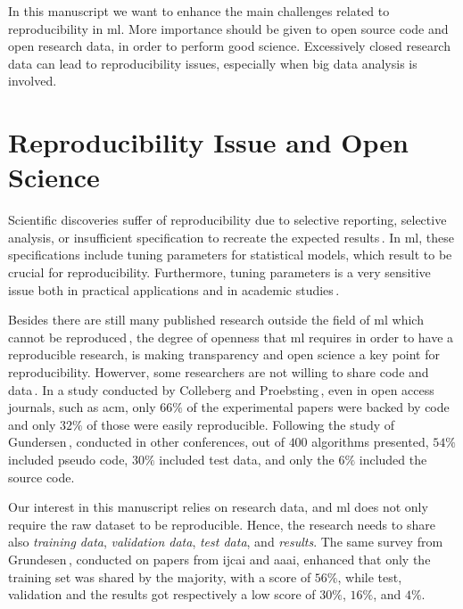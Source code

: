In this manuscript we want to enhance the main challenges related to reproducibility
in \ac{ml}. More importance should be given to open source
code and open research data, in order to perform good science.
Excessively closed research data can lead to reproducibility issues,
especially when big data analysis is involved.

\section{Reproducibility Issue and Open Science}
Scientific discoveries suffer of reproducibility due
to selective reporting, selective analysis, or insufficient specification to recreate the
expected results\,\cite{aarts2016reproducibility}. 
In \ac{ml}, these specifications include tuning parameters for statistical models, 
which result to be crucial for reproducibility. Furthermore, tuning parameters
is a very sensitive issue both in practical applications and in academic studies\,\cite{birattari2004problem}.

Besides there are still many published research outside the field of \ac{ml} which cannot be
reproduced\,\cite{begley2012drug, begley2015reproducibility, prinz2011believe},
the degree of openness that \ac{ml} requires in order to have a reproducible research, is making
transparency and open science a key point for reproducibility.
Howerver, some researchers are not willing to share code and data\,\cite{gundersen2018state}.
In a study conducted by Colleberg and Proebsting\,\cite{Collberg:2016:RCS:2897191.2812803},
even in open access journals, such as \ac{acm}, only $66\%$ of the experimental papers
were backed by code and only $32\%$ of those were easily reproducible.
Following the study of Gundersen\,\cite{gundersen2018state},
conducted in other conferences, out of $400$ algorithms presented,
$54\%$ included pseudo code, $30\%$ included test data, and only the $6\%$
included the source code.

Our interest in this manuscript relies on research data, and \ac{ml} does not only require the raw dataset
to be reproducible.
Hence, the research needs to share also \emph{training data}, \emph{validation data},
\emph{test data}, and \emph{results}. The same survey from
Grundesen\,\cite{gundersen2018state}, conducted on papers from \ac{ijcai} and \ac{aaai}, enhanced that
only the training set was shared by the majority, with a score of $56\%$, while test, validation and the results
got respectively a low score of $30\%$, $16\%$, and $4\%$.


